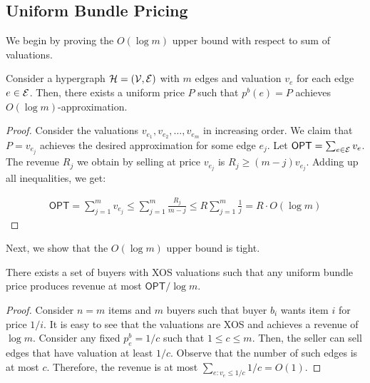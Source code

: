 \subsection{Uniform Bundle Pricing}

We begin by proving the $O(\log m)$ upper bound with respect to sum of valuations. 

\begin{lemma}
	Consider a hypergraph $\mathcal{H} = (\mathcal{V}, \mathcal{E})$ with $m$ edges and valuation $v_e$ for each edge $e \in \mathcal{E}$. Then, there exists a uniform price $P$ such that $p^{b}(e) = P$ achieves $O(\log m)$-approximation. 
\end{lemma}

\begin{proof}
Consider the valuations $v_{e_1}, v_{e_2}, \dots, v_{e_m}$ in increasing order. We claim that $P  = v_{e_j}$ achieves the desired approximation for some edge $e_{j}$. 
Let $\textsf{OPT} = \sum_{e \in \mathcal{E}} v_e$. The revenue $R_j$ we obtain by selling at price $v_{e_j}$ is $R_j \geq (m-j)v_{e_j} $. 
Adding up all inequalities, we get:
	
	\begin{equation*}
	\begin{aligned}
	\textsf{OPT} = \sum_{j=1}^m v_{e_j} \leq  \sum_{j=1}^m \frac{R_j}{m-j} \leq R \sum_{j=1}^m \frac{1}{j} = R \cdot O(\log m) 
	\end{aligned}
	\end{equation*}
\end{proof}

Next, we show that the $O(\log m)$ upper bound is tight.

\begin{lemma}
	There exists a set of buyers with XOS valuations such that any uniform bundle price produces revenue at most $\textsf{OPT}/ \log m$.
\end{lemma}	
\begin{proof}
	Consider $n=m$ items and $m$ buyers such that buyer $b_i$ wants item $i$ for price $1/i$. It is easy to see that the valuations are XOS and achieves a revenue of $\log m$. Consider any fixed $p^b_e = 1/c$ such that $1 \leq c \leq m$. Then, the seller can sell edges that have valuation at least $1/c$. Observe that the number of such edges is at most $c$. Therefore, the revenue is at most $\sum_{e:v_e \leq 1/c} 1/c = O(1)$.
\end{proof}

